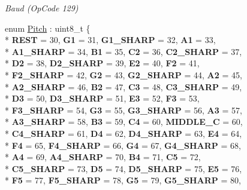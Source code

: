 \begin{DoxyCompactItemize}
\begin{DoxyCompactList}\small\item\em Baud (Op\+Code 129) \end{DoxyCompactList}\item 
\hypertarget{namespaceroomba_1_1series500_1_1oi_a1a8bf7d79627d7b145a833e43b8cd214}{enum \hyperlink{namespaceroomba_1_1series500_1_1oi_a1a8bf7d79627d7b145a833e43b8cd214}{Pitch} \+: uint8\+\_\+t \{ \\*
{\bfseries R\+E\+S\+T} = 30, 
{\bfseries G1} = 31, 
{\bfseries G1\+\_\+\+S\+H\+A\+R\+P} = 32, 
{\bfseries A1} = 33, 
\\*
{\bfseries A1\+\_\+\+S\+H\+A\+R\+P} = 34, 
{\bfseries B1} = 35, 
{\bfseries C2} = 36, 
{\bfseries C2\+\_\+\+S\+H\+A\+R\+P} = 37, 
\\*
{\bfseries D2} = 38, 
{\bfseries D2\+\_\+\+S\+H\+A\+R\+P} = 39, 
{\bfseries E2} = 40, 
{\bfseries F2} = 41, 
\\*
{\bfseries F2\+\_\+\+S\+H\+A\+R\+P} = 42, 
{\bfseries G2} = 43, 
{\bfseries G2\+\_\+\+S\+H\+A\+R\+P} = 44, 
{\bfseries A2} = 45, 
\\*
{\bfseries A2\+\_\+\+S\+H\+A\+R\+P} = 46, 
{\bfseries B2} = 47, 
{\bfseries C3} = 48, 
{\bfseries C3\+\_\+\+S\+H\+A\+R\+P} = 49, 
\\*
{\bfseries D3} = 50, 
{\bfseries D3\+\_\+\+S\+H\+A\+R\+P} = 51, 
{\bfseries E3} = 52, 
{\bfseries F3} = 53, 
\\*
{\bfseries F3\+\_\+\+S\+H\+A\+R\+P} = 54, 
{\bfseries G3} = 55, 
{\bfseries G3\+\_\+\+S\+H\+A\+R\+P} = 56, 
{\bfseries A3} = 57, 
\\*
{\bfseries A3\+\_\+\+S\+H\+A\+R\+P} = 58, 
{\bfseries B3} = 59, 
{\bfseries C4} = 60, 
{\bfseries M\+I\+D\+D\+L\+E\+\_\+\+C} = 60, 
\\*
{\bfseries C4\+\_\+\+S\+H\+A\+R\+P} = 61, 
{\bfseries D4} = 62, 
{\bfseries D4\+\_\+\+S\+H\+A\+R\+P} = 63, 
{\bfseries E4} = 64, 
\\*
{\bfseries F4} = 65, 
{\bfseries F4\+\_\+\+S\+H\+A\+R\+P} = 66, 
{\bfseries G4} = 67, 
{\bfseries G4\+\_\+\+S\+H\+A\+R\+P} = 68, 
\\*
{\bfseries A4} = 69, 
{\bfseries A4\+\_\+\+S\+H\+A\+R\+P} = 70, 
{\bfseries B4} = 71, 
{\bfseries C5} = 72, 
\\*
{\bfseries C5\+\_\+\+S\+H\+A\+R\+P} = 73, 
{\bfseries D5} = 74, 
{\bfseries D5\+\_\+\+S\+H\+A\+R\+P} = 75, 
{\bfseries E5} = 76, 
\\*
{\bfseries F5} = 77, 
{\bfseries F5\+\_\+\+S\+H\+A\+R\+P} = 78, 
{\bfseries G5} = 79, 
{\bfseries G5\+\_\+\+S\+H\+A\+R\+P} = 80, 
}
\end{DoxyCompactItemize}
